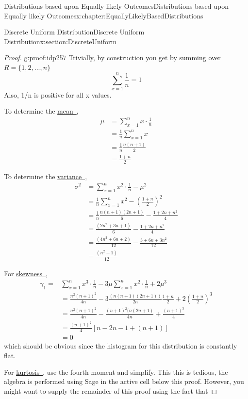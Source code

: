 \documentclass[oneside,10pt,]{book}
\newcommand{\xreffont}{\relax}
\numberwithin{equation}{section}
\begin{document}
\begin{chapterptx}{Distributions based upon Equally likely Outcomes}{}{Distributions based upon Equally likely Outcomes}{}{}{x:chapter:EquallyLikelyBasedDistributions}
\begin{sectionptx}{Discrete Uniform Distribution}{}{Discrete Uniform Distribution}{}{}{x:section:DiscreteUniform}
\begin{proof}{}{g:proof:idp257}
Trivially, by construction you get by summing over \(R = \{1, 2, ... , n \}\)%
\begin{equation*}
\sum_{x=1}^n \frac{1}{n} = 1
\end{equation*}
Also, 1\slash{}n is positive for all x values.%
\par
To determine the \hyperlink{x:li:TheoreticalMean}{mean~{\xreffont 1}},%
\begin{align*}
\mu & = \sum_{x=1}^n x \cdot \frac{1}{n}\\
& = \frac{1}{n}\sum_{x=1}^n x \\
& = \frac{1}{n} \frac{n(n+1)}{2}\\
& = \frac{1+n}{2}
\end{align*}
%
\par
To determine the \hyperlink{x:li:TheoreticalVariance}{variance~{\xreffont 2}},%
\begin{align*}
\sigma^2 & = \sum_{x=1}^n x^2 \cdot \frac{1}{n} - \mu^2\\
& = \frac{1}{n}\sum_{x=1}^n x^2 - \left ( \frac{1+n}{2}\right )^2 \\
& = \frac{1}{n} \frac{n(n+1)(2n+1)}{6} - \frac{1+2n+n^2}{4}\\
& = \frac{(2n^2+3n+1)}{6} - \frac{1+2n+n^2}{4}\\
& = \frac{(4n^2+6n+2)}{12} - \frac{3+6n+3n^2}{12}\\
& = \frac{(n^2-1)}{12}
\end{align*}
%
\par
For \hyperlink{x:li:TheoreticalSkewness}{skewness~{\xreffont 3}},%
\begin{align*}
\gamma_1 = & \sum_{x=1}^n x^3 \cdot \frac{1}{n} - 3 \mu \sum_{x=1}^n x^2 \cdot \frac{1}{n}  + 2\mu^3\\
& = \frac{n^2(n+1)^2}{4n} - 3\frac{(n(n+1)(2n+1))}{2n} \frac{1+n}{2} + 2 \left ( \frac{1+n}{2}\right )^3 \\
& = \frac{n^2(n+1)^2}{4n} - \frac{(n+1)^2 (n(2n+1)}{4n} + \frac{(n+1)^3}{4}\\
& = \frac{(n+1)^2}{4} \left [ n - 2n -1 + (n+1) \right ]\\
& = 0
\end{align*}
which should be obvious since the histogram for this distribution is constantly flat.%
\par
For \hyperlink{x:li:TheoreticalKurtosis}{kurtosis~{\xreffont 4}}, use the fourth moment and simplify.  This this is tedious, the algebra is performed using Sage in the active cell below this proof. However, you might want to supply the remainder of this proof using the fact that%

\end{proof}
\end{sectionptx}
\end{chapterptx}
\end{document}
